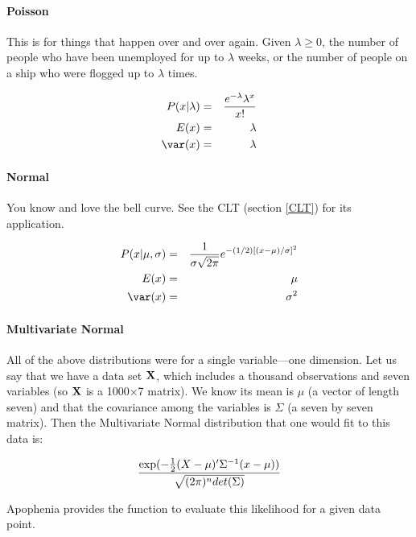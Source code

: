 \paragraph{Poisson}

This is for things that happen over and over again. Given
$\lambda\geq0$, 
the number of people who have been unemployed for
up to $\lambda$ weeks,
or the number of people on a ship who were flogged up to
$\lambda$ times. 

\begin{eqnarray}
P(x|\lambda)&=&{e^{-\lambda}\lambda^x\over x!}			\nonumber\\
E(x)&=&	\lambda							\nonumber\\
\var(x)&=&\lambda						\nonumber
\end{eqnarray}

\paragraph{Normal}

You know and love the bell curve. See the CLT (section \ref{CLT}) for
its application.

\begin{eqnarray}					\label{normal}
P(x|\mu,\sigma)&=&{1\over \sigma\sqrt{2\pi}} e^{-(1/2)[(x-\mu)/\sigma]^2}\\ 
E(x)&=&\mu							\nonumber\\
\var(x)&=&\sigma^2						\nonumber
\end{eqnarray}

\paragraph{Multivariate Normal}
All of the above distributions were for a single variable---one
dimension. Let us say that we have a data set ${\bf X}$, which includes a
thousand observations and seven variables (so ${\bf X}$ is a 1000$\times$7
matrix). We know its mean is
$\mu$ (a vector of length seven) and that the covariance among the
variables is $\Sigma$ (a seven by seven matrix). Then the Multivariate
Normal distribution that one would fit to this data is:

\begin{eqnarray}					
{\exp(-{1\over 2} (X-\mu)' \Sigma^{-1} (x-\mu)) 
\over
   \sqrt{(2 \pi)^n det(\Sigma)}}
\end{eqnarray}					

Apophenia provides the function  to evaluate this likelihood for a given data point.



